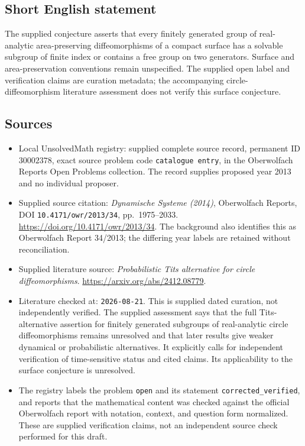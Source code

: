 \documentclass[11pt]{article}
\begin{document}
\subsection{Short English statement}
The supplied conjecture asserts that every finitely generated group of real-analytic area-preserving diffeomorphisms of a compact surface has a solvable subgroup of finite index or contains a free group on two generators. Surface and area-preservation conventions remain unspecified. The supplied open label and verification claims are curation metadata; the accompanying circle-diffeomorphism literature assessment does not verify this surface conjecture.
\subsection{Sources}
\begin{itemize}
\item Local UnsolvedMath registry: supplied complete source record, permanent ID \(30002378\), exact source problem code \texttt{catalogue entry}, in the Oberwolfach Reports Open Problems collection. The record supplies proposed year 2013 and no individual proposer.
\item Supplied source citation: \emph{Dynamische Systeme (2014)}, Oberwolfach Reports, DOI \texttt{10.4171/owr/2013/34}, pp.\ 1975--2033. \url{https://doi.org/10.4171/owr/2013/34}. The background also identifies this as Oberwolfach Report 34/2013; the differing year labels are retained without reconciliation.
\item Supplied literature source: \emph{Probabilistic Tits alternative for circle diffeomorphisms}. \url{https://arxiv.org/abs/2412.08779}.
\item Literature checked at: \texttt{2026-08-21}. This is supplied dated curation, not independently verified. The supplied assessment says that the full Tits-alternative assertion for finitely generated subgroups of real-analytic circle diffeomorphisms remains unresolved and that later results give weaker dynamical or probabilistic alternatives. It explicitly calls for independent verification of time-sensitive status and cited claims. Its applicability to the surface conjecture is unresolved.
\item The registry labels the problem \texttt{open} and its statement \texttt{corrected\_verified}, and reports that the mathematical content was checked against the official Oberwolfach report with notation, context, and question form normalized. These are supplied verification claims, not an independent source check performed for this draft.
\end{itemize}
\end{document}
